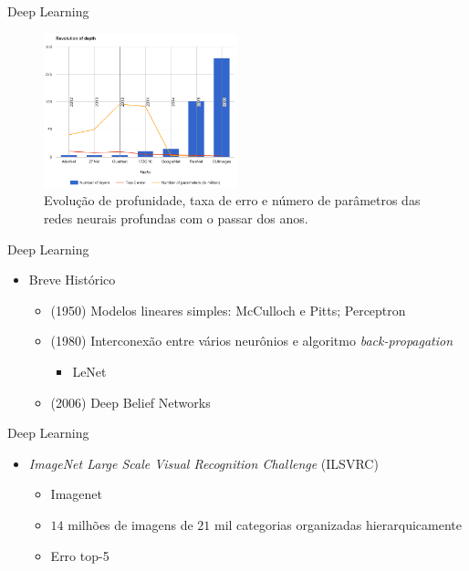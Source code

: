 \begin{frame}{Deep Learning}
   \ \  \\[0.1cm]
   \begin{figure}[ht]
   	\centering
   	\label{fig:compara_redes}
   	\includegraphics[width=0.5\textwidth]{img/compara_redes.png}
     \caption{\footnotesize{Evolução de profunidade, taxa de erro e número de parâmetros das redes neurais profundas com o passar dos anos.}}
   \end{figure}
\end{frame}

\begin{frame}{Deep Learning}
   \ \  \\[0.1cm]
   \begin{itemize}
     \item Breve Histórico
     \begin{itemize}
       \item (1950) Modelos lineares simples: McCulloch e Pitts; Perceptron
       \item (1980) Interconexão entre vários neurônios e algoritmo \emph{back-propagation}
       \begin{itemize}
         \item LeNet
       \end{itemize}
       \item (2006) Deep Belief Networks
     \end{itemize}
   \end{itemize}
\end{frame}

\begin{frame}{Deep Learning}
   \ \  \\[0.1cm]
   \begin{itemize}
     \item \emph{ImageNet Large Scale Visual Recognition Challenge} (ILSVRC)
     \begin{itemize}
       \item Imagenet
       \item $14$ milhões de imagens de $21$ mil categorias organizadas hierarquicamente
       \item Erro top-5
     \end{itemize}
   \end{itemize}
\end{frame}

